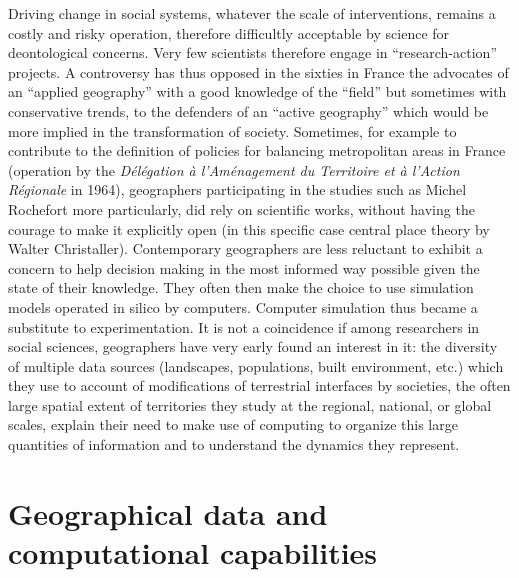 \documentclass[10pt]{article}
\begin{document}
Driving change in social systems, whatever the scale of interventions, remains a costly and risky operation, therefore difficultly acceptable by science for deontological concerns. Very few scientists therefore engage in ``research-action'' projects. A controversy has thus opposed in the sixties in France the advocates of an ``applied geography'' with a good knowledge of the ``field'' but sometimes with conservative trends, to the defenders of an ``active geography'' which would be more implied in the transformation of society. Sometimes, for example to contribute to the definition of policies for balancing metropolitan areas in France (operation by the \emph{D{\'e}l{\'e}gation {\`a} l'Am{\'e}nagement du Territoire et à l'Action R{\'e}gionale} in 1964), geographers participating in the studies such as Michel Rochefort more particularly, did rely on scientific works, without having the courage to make it explicitly open (in this specific case central place theory by Walter Christaller). Contemporary geographers are less reluctant to exhibit a concern to help decision making in the most informed way possible given the state of their knowledge. They often then make the choice to use simulation models operated in silico by computers. Computer simulation thus became a substitute to experimentation. It is not a coincidence if among researchers in social sciences, geographers have very early found an interest in it: the diversity of multiple data sources (landscapes, populations, built environment, etc.) which they use to account of modifications of terrestrial interfaces by societies, the often large spatial extent of territories they study at the regional, national, or global scales, explain their need to make use of computing to organize this large quantities of information and to understand the dynamics they represent.



\section{Geographical data and computational capabilities}
\end{document}
